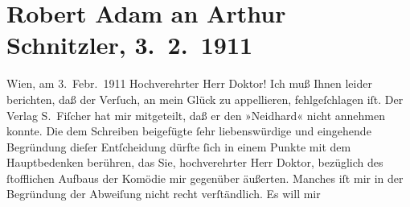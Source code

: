 

         
         \newcommand{\erwaehntePersonen}{Personen: Julius Bittner}
         \newcommand{\erwaehnteInstitutionen}{Institutionen: Der Merker, S. Fischer Verlag}
         \newcommand{\erwaehnteOrte}{Orte: Wien}
         \newcommand{\erwaehnteWerke}{Werke: Die Geschichte des Alî ibn Bekkâr mit Schams an-Nahâr, Neidhard}
               \section[Robert Adam an Arthur Schnitzler, 3. 2. 1911]{ Robert Adam an Arthur Schnitzler, 3. 2. 1911}\nopagebreak{}\rehead{ }\begin{ledgroupsized}[t]{13cm}\normalsize\beginnumbering \toendnotes[C]{\smallbreak\pagebreak[2]} 
\toendnotes[C]{\smallbreak}\pstart
           \raggedleft{}{\pb}Wien, am 3. Febr. 1911\pend
           \pstart{}Hochverehrter Herr Doktor!\pend\pstart
           Ich muß Ihnen leider berichten, daß der Verſuch, an mein Glück zu appellieren,
                    fehlgeſchlagen iſt. Der Verlag S. Fiſcher hat
                    mir mitgeteilt, daß er den »Neidhard« nicht
                    annehmen konnte. Die dem Schreiben beigefügte ſehr liebenswürdige und eingehende
                    Begründung dieſer Entſcheidung dürfte ſich in einem Punkte mit dem Hauptbedenken
                    berühren, das Sie, hochverehrter Herr Doktor, {\pb}bezüglich des ſtofflichen Aufbaus der Komödie mir gegenüber äußerten. Manches
                    iſt mir in der Begründung der Abweiſung nicht recht verſtändlich. Es will mir

\end{ledgroupsized}
